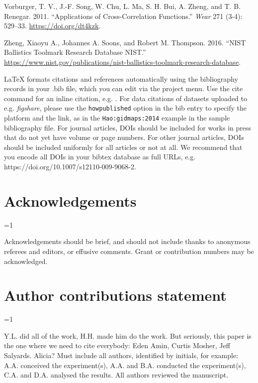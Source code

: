 \documentclass[fleqn,10pt]{wlscirep}
\newcommand{\ifinstruction}{1} %
\newlength{\cslhangindent}
\newenvironment{CSLReferences}[2] %
{\begin{list}{}{%
	\setlength{\itemindent}{0pt}
	\setlength{\leftmargin}{0pt}
	\setlength{\parsep}{0pt}
	\ifodd #1
	\setlength{\leftmargin}{\cslhangindent}
	\setlength{\itemindent}{-1\cslhangindent}
	\fi
	\setlength{\itemsep}{#2\baselineskip}}}
{\end{list}}
\begin{document}
\begin{CSLReferences}{1}{0}
Vorburger, T. V., J.-F. Song, W. Chu, L. Ma, S. H. Bui, A. Zheng, and T.
B. Renegar. 2011. {``Applications of Cross-Correlation Functions.''}
\emph{Wear} 271 (3-4): 529--33. \url{https://doi.org/dt4kzk}.

Zheng, Xiaoyu A., Johannes A. Soons, and Robert M. Thompson. 2016.
{``{NIST Ballistics Toolmark Research Database} {\textbar} {NIST}.''}
\url{https://www.nist.gov/publications/nist-ballistics-toolmark-research-database}.

\end{CSLReferences}



\noindent LaTeX formats citations and references automatically using the bibliography records in your .bib file, which you can edit via the project menu. Use the cite command for an inline citation, e.g. \cite{Kaufman2020, Figueredo:2009dg, Babichev2002, behringer2014manipulating}. For data citations of datasets uploaded to e.g. \emph{figshare}, please use the \verb|howpublished| option in the bib entry to specify the platform and the link, as in the \verb|Hao:gidmaps:2014| example in the sample bibliography file. For journal articles, DOIs should be included for works in press that do not yet have volume or page numbers. For other journal articles, DOIs should be included uniformly for all articles or not at all. We recommend that you encode all DOIs in your bibtex database as full URLs, e.g. https://doi.org/10.1007/s12110-009-9068-2.

\section*{Acknowledgements} 
\ifnum \ifinstruction=1

Acknowledgements should be brief, and should not include thanks to
anonymous referees and editors, or effusive comments. Grant or
contribution numbers may be acknowledged. \fi

\section*{Author contributions statement}

\ifnum \ifinstruction=1
\fi

Y.L. did all of the work, H.H. made him do the work. But seriously, this
paper is the one where we need to cite everybody: Eden Amin, Curtis
Mosher, Jeff Salyards. Alicia?
Must include all authors, identified by initials, for example:
A.A. conceived the experiment(s), A.A. and B.A. conducted the experiment(s), C.A. and D.A. analysed the results. All authors reviewed the manuscript. 
\end{document}

